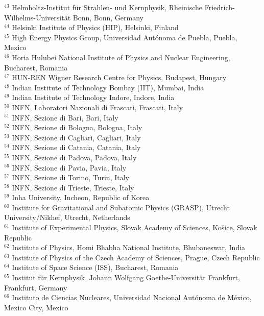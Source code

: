 \begin{flushleft}
$^{43}$ Helmholtz-Institut f\"{u}r Strahlen- und Kernphysik, Rheinische Friedrich-Wilhelms-Universit\"{a}t Bonn, Bonn, Germany\\
$^{44}$ Helsinki Institute of Physics (HIP), Helsinki, Finland\\
$^{45}$ High Energy Physics Group,  Universidad Aut\'{o}noma de Puebla, Puebla, Mexico\\
$^{46}$ Horia Hulubei National Institute of Physics and Nuclear Engineering, Bucharest, Romania\\
$^{47}$ HUN-REN Wigner Research Centre for Physics, Budapest, Hungary\\
$^{48}$ Indian Institute of Technology Bombay (IIT), Mumbai, India\\
$^{49}$ Indian Institute of Technology Indore, Indore, India\\
$^{50}$ INFN, Laboratori Nazionali di Frascati, Frascati, Italy\\
$^{51}$ INFN, Sezione di Bari, Bari, Italy\\
$^{52}$ INFN, Sezione di Bologna, Bologna, Italy\\
$^{53}$ INFN, Sezione di Cagliari, Cagliari, Italy\\
$^{54}$ INFN, Sezione di Catania, Catania, Italy\\
$^{55}$ INFN, Sezione di Padova, Padova, Italy\\
$^{56}$ INFN, Sezione di Pavia, Pavia, Italy\\
$^{57}$ INFN, Sezione di Torino, Turin, Italy\\
$^{58}$ INFN, Sezione di Trieste, Trieste, Italy\\
$^{59}$ Inha University, Incheon, Republic of Korea\\
$^{60}$ Institute for Gravitational and Subatomic Physics (GRASP), Utrecht University/Nikhef, Utrecht, Netherlands\\
$^{61}$ Institute of Experimental Physics, Slovak Academy of Sciences, Ko\v{s}ice, Slovak Republic\\
$^{62}$ Institute of Physics, Homi Bhabha National Institute, Bhubaneswar, India\\
$^{63}$ Institute of Physics of the Czech Academy of Sciences, Prague, Czech Republic\\
$^{64}$ Institute of Space Science (ISS), Bucharest, Romania\\
$^{65}$ Institut f\"{u}r Kernphysik, Johann Wolfgang Goethe-Universit\"{a}t Frankfurt, Frankfurt, Germany\\
$^{66}$ Instituto de Ciencias Nucleares, Universidad Nacional Aut\'{o}noma de M\'{e}xico, Mexico City, Mexico\\

\end{flushleft}
